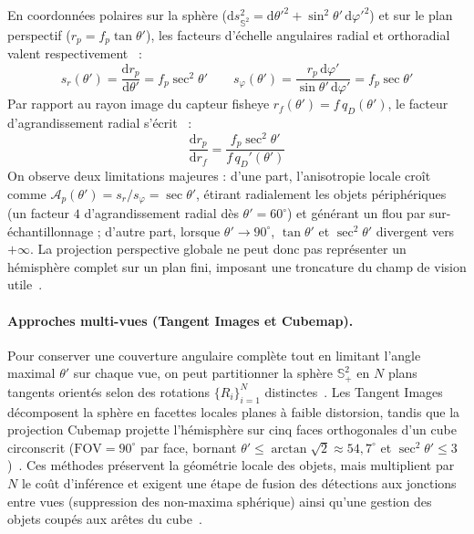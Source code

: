 \documentclass[11pt,a4paper]{article}
\renewcommand{\emph}[1]{\textup{#1}}
\begin{document}
En coordonnées polaires sur la sphère ($\mathrm{d}s_{\mathbb{S}^2}^2 = \mathrm{d}\theta'^2 + \sin^2\theta'\,\mathrm{d}\varphi'^2$) et sur le plan perspectif ($r_p = f_p\tan\theta'$), les facteurs d'échelle angulaires radial et orthoradial valent respectivement~\cite{snyder1987} :
\begin{equation}
  s_r(\theta') = \frac{\mathrm{d}r_p}{\mathrm{d}\theta'} = f_p\sec^2\theta' \qquad
  s_\varphi(\theta') = \frac{r_p\,\mathrm{d}\varphi'}{\sin\theta'\,\mathrm{d}\varphi'} = f_p\sec\theta'
\end{equation}
Par rapport au rayon image du capteur fisheye $r_f(\theta') = f\,q_D(\theta')$, le facteur d'agrandissement radial s'écrit~\cite{kannala2006,hughes2008} :
\begin{equation}
  \frac{\mathrm{d}r_p}{\mathrm{d}r_f} = \frac{f_p\sec^2\theta'}{f\,q_D'(\theta')}
\end{equation}
On observe deux limitations majeures : d'une part, l'anisotropie locale croît comme $\mathcal{A}_p(\theta') = s_r / s_\varphi = \sec\theta'$, étirant radialement les objets périphériques (un facteur $4$ d'agrandissement radial dès $\theta' = 60^\circ$) et générant un flou par sur-échantillonnage ; d'autre part, lorsque $\theta' \to 90^\circ$, $\tan\theta'$ et $\sec^2\theta'$ divergent vers $+\infty$. La projection perspective globale ne peut donc pas représenter un hémisphère complet sur un plan fini, imposant une troncature du champ de vision utile~\cite{yogamani2019}.

\paragraph{Approches multi-vues (\emph{Tangent Images} et \emph{Cubemap}).}
Pour conserver une couverture angulaire complète tout en limitant l'angle maximal $\theta'$ sur chaque vue, on peut partitionner la sphère $\mathbb{S}^2_+$ en $N$ plans tangents orientés selon des rotations $\{R_i\}_{i=1}^N$ distinctes~\cite{eder2020,chiang2021}. Les \emph{Tangent Images}~\cite{eder2020} décomposent la sphère en facettes locales planes à faible distorsion, tandis que la projection \emph{Cubemap} projette l'hémisphère sur cinq faces orthogonales d'un cube circonscrit ($\text{FOV} = 90^\circ$ par face, bornant $\theta' \le \arctan\sqrt{2} \approx 54{,}7^\circ$ et $\sec^2\theta' \le 3$)~\cite{greene1986,wang2019cubemap}. Ces méthodes préservent la géométrie locale des objets, mais multiplient par $N$ le coût d'inférence et exigent une étape de fusion des détections aux jonctions entre vues (suppression des non-maxima sphérique) ainsi qu'une gestion des objets coupés aux arêtes du cube~\cite{wang2019cubemap,chiang2021}.
\end{document}
